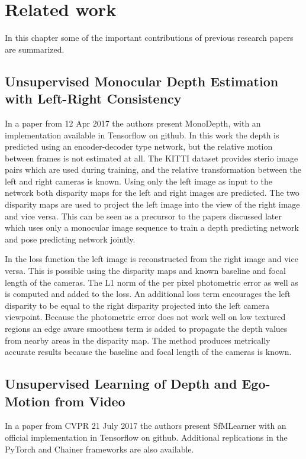 \chapter{Related work}\label{cha:relatedwork}


In this chapter some of the important contributions of previous research papers are summarized.

\section{Unsupervised Monocular Depth Estimation with Left-Right Consistency \cite{leftright}}
\label{sec:relwork:leftright}
In a paper from 12 Apr 2017 the authors present MonoDepth, with an implementation available in Tensorflow on github. In this work the depth is predicted using an encoder-decoder type network, but the relative motion between frames is not estimated at all. The KITTI dataset provides sterio image pairs which are used during training, and the relative transformation between the left and right cameras is known. Using only the left image as input to the network both disparity maps for the left and right images are predicted. The two disparity maps are used to project the left image into the view of the right image and vice versa. This can be seen as a precursor to the papers discussed later which uses only a monocular image sequence to train a depth predicting network and pose predicting network jointly.

In the loss function the left image is reconstructed from the right image and vice versa. This is possible using the disparity maps and known baseline and focal length of the cameras. The L1 norm of the per pixel photometric error as well as \abbrSSIM is computed and added to the loss. An additional loss term encourages the left disparity to be equal to the right disparity projected into the left camera viewpoint. Because the photometric error does not work well on low textured regions an edge aware smoothess term is added to propagate the depth values from nearby areas in the disparity map. The method produces metrically accurate results because the baseline and focal length of the cameras is known.

\section{Unsupervised Learning of Depth and Ego-Motion from Video \cite{sfmlearner}}
\label{sec:relwork:unego}
In a paper from CVPR 21 July 2017 the authors present SfMLearner with an official implementation in Tensorflow on github. Additional replications in the PyTorch and Chainer frameworks are also available.

